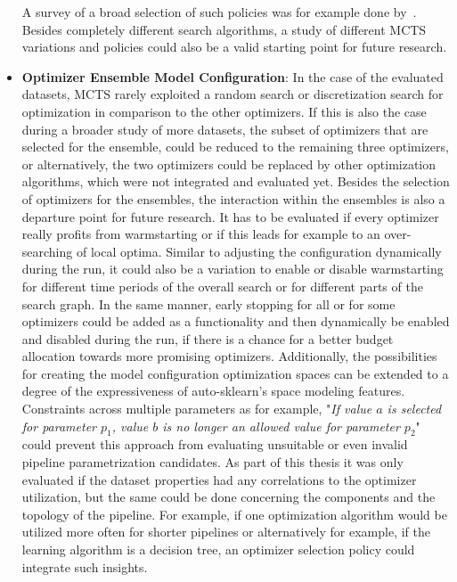 \begin{itemize}
    A survey of a broad selection of such policies was for example done by~\textcite{Browne-Policies}.
    Besides completely different search algorithms, a study of different MCTS variations and policies could also be a valid starting point for future research.
    \item \textbf{Optimizer Ensemble Model Configuration}: In the case of the evaluated datasets, MCTS rarely exploited a random search or discretization search for optimization in comparison to the other optimizers.
    If this is also the case during a broader study of more datasets, the subset of optimizers that are selected for the ensemble, could be reduced to the remaining three optimizers, or alternatively, the two optimizers could be replaced by other optimization algorithms, which were not integrated and evaluated yet.\newline
    Besides the selection of optimizers for the ensembles, the interaction within the ensembles is also a departure point for future research.
    It has to be evaluated if every optimizer really profits from warmstarting or if this leads for example to an over-searching of local optima.\newline
    Similar to adjusting the configuration dynamically during the run, it could also be a variation to enable or disable warmstarting for different time periods of the overall search or for different parts of the search graph.
    In the same manner, early stopping for all or for some optimizers could be added as a functionality and then dynamically be enabled and disabled during the run, if there is a chance for a better budget allocation towards more promising optimizers.\newline
    Additionally, the possibilities for creating the model configuration optimization spaces can be extended to a degree of the expressiveness of auto-sklearn's space modeling features.
    Constraints across multiple parameters as for example, "\textit{If value $a$ is selected for parameter $p_1$, value $b$ is no longer an allowed value for parameter $p_2$}" could prevent this approach from evaluating unsuitable or even invalid pipeline parametrization candidates.\newline
    As part of this thesis it was only evaluated if the dataset properties had any correlations to the optimizer utilization, but the same could be done concerning the components and the topology of the pipeline.
    For example, if one optimization algorithm would be utilized more often for shorter pipelines or alternatively for example, if the learning algorithm is a decision tree, an optimizer selection policy could integrate such insights.

\end{itemize}
